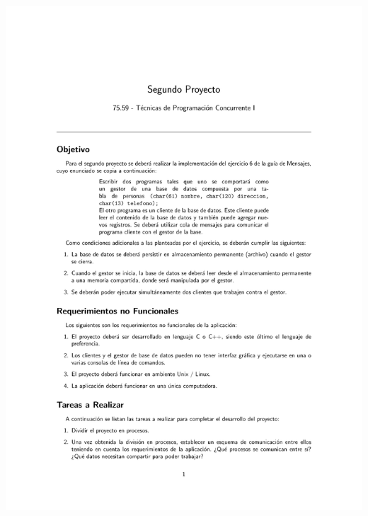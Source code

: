 \documentclass[11pt]{article}
\begin{document}
\begin{center}
\includegraphics[trim = 25mm 30mm 10mm 35mm, clip,height=0.93\textheight,width=1.04\textwidth]{SegundoProyecto.pdf}

\end{center}
\end{document}
